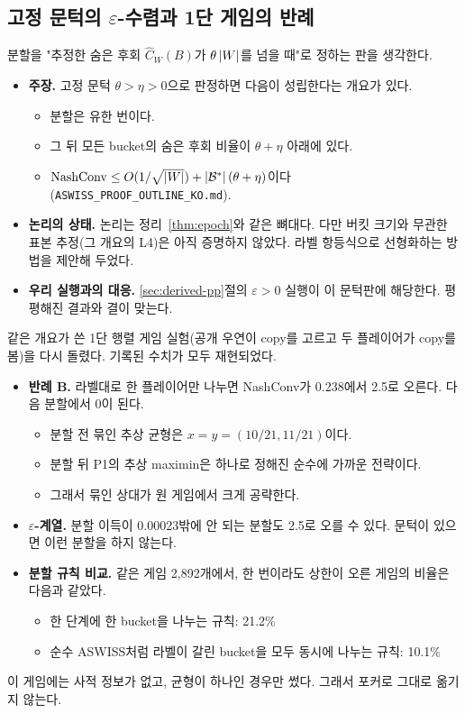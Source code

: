 \subsection{고정 문턱의 $\varepsilon$-수렴과 1단 게임의 반례}\label{sec:derived-theta}
분할을 "추정한 숨은 후회 $\hat C_W(B)$가 $\theta\left\lvert W\right\rvert$를 넘을 때"로 정하는 판을 생각한다.
\begin{itemize}
  \item \textbf{주장.} 고정 문턱 $\theta>\eta>0$으로 판정하면 다음이 성립한다는 개요가 있다.
    \begin{itemize}
      \item 분할은 유한 번이다.
      \item 그 뒤 모든 bucket의 숨은 후회 비율이 $\theta+\eta$ 아래에 있다.
      \item $\mathrm{NashConv}\le O(1/\sqrt{\left\lvert W\right\rvert})+\left\lvert \mathcal{B}^*\right\rvert(\theta+\eta)$이다(\texttt{ASWISS\_PROOF\_OUTLINE\_KO.md}).
    \end{itemize}
  \item \textbf{논리의 상태.} 논리는 정리~\ref{thm:epoch}와 같은 뼈대다. 다만 버킷 크기와 무관한 표본 추정(그 개요의 L4)은 아직 증명하지 않았다. 라벨 항등식으로 선형화하는 방법을 제안해 두었다.
  \item \textbf{우리 실행과의 대응.} \ref{sec:derived-pp}절의 $\varepsilon>0$ 실행이 이 문턱판에 해당한다. 평평해진 결과와 결이 맞는다.
\end{itemize}
같은 개요가 쓴 1단 행렬 게임 실험(공개 우연이 copy를 고르고 두 플레이어가 copy를 봄)을 다시 돌렸다. 기록된 수치가 모두 재현되었다.
\begin{itemize}
  \item \textbf{반례 B.} 라벨대로 한 플레이어만 나누면 NashConv가 0.238에서 2.5로 오른다. 다음 분할에서 0이 된다.
    \begin{itemize}
      \item 분할 전 묶인 추상 균형은 $x=y=(10/21,11/21)$이다.
      \item 분할 뒤 P1의 추상 maximin은 하나로 정해진 순수에 가까운 전략이다.
      \item 그래서 묶인 상대가 원 게임에서 크게 공략한다.
    \end{itemize}
  \item \textbf{$\varepsilon$-계열.} 분할 이득이 0.00023밖에 안 되는 분할도 2.5로 오를 수 있다. 문턱이 있으면 이런 분할을 하지 않는다.
  \item \textbf{분할 규칙 비교.} 같은 게임 2,892개에서, 한 번이라도 상한이 오른 게임의 비율은 다음과 같았다.
    \begin{itemize}
      \item 한 단계에 한 bucket을 나누는 규칙: 21.2\%
      \item 순수 ASWISS처럼 라벨이 갈린 bucket을 모두 동시에 나누는 규칙: 10.1\%
    \end{itemize}
\end{itemize}
이 게임에는 사적 정보가 없고, 균형이 하나인 경우만 썼다. 그래서 포커로 그대로 옮기지 않는다.

